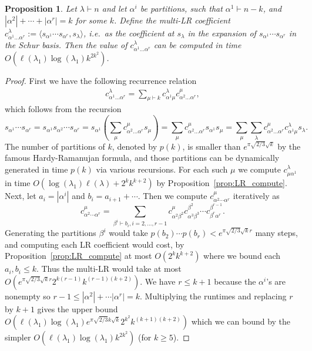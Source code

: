 \documentclass[11pt]{amsart}
\newtheorem{prop}[thm]{Proposition}
\theoremstyle{plain}
\theoremstyle{definition}
\numberwithin{equation}{section}
\newcommand{\la}{\lambda}
\newcommand{\al}{\alpha}
\def\la{\lambda}
\begin{document}
\begin{prop}\label{prop:multiLR_compute}
Let $\la \vdash n$ and let $\al^i$ be partitions, such that $\al^1 \vdash n-k$, and $|\al^2|+\cdots+|\al^r|=k$ for some $k$. Define the multi-LR coefficient $c^{\la}_{\al^1 \ldots \al^r} := \langle s_{\al^1}\cdots s_{\al^r},s_{\la} \rangle$, i.e.\ as the coefficient at $s_\la$ in the expansion of $s_{\al^1}\cdots s_{\al^r}$ in the Schur basis. Then the value of $c^{\la}_{\al^1\ldots \al^r}$ can be computed in time $O(\ell(\la_1) \log(\la_1) k^{2k^2})$.
\end{prop}
\begin{proof}
First we have the following recurrence relation
\begin{align}
c^{\la}_{\al^1\ldots \al^r} = \sum_{\mu \vdash k} c^{\la}_{\al^1 \mu} c^{\mu}_{\al^2 \ldots \al^r},
\end{align}
which follows from the recursion
$$s_{\al^1}\cdots s_{\al^r} = s_{\al^1} s_{\al^2}\cdots s_{\al^r} = s_{\al^1}\left( \sum_{\mu} c^{\mu}_{\al^2\ldots \al^r}s_\mu \right)=\sum_\mu c^{\mu}_{\al^2\ldots \al^r} s_{\al^1}s_\mu = \sum_\mu \sum_\la c^{\mu}_{\al^2\ldots \al^r} c^{\la}_{\al^1\mu} s_\la.$$
The number of partitions of $k$, denoted by $p(k)$, is smaller than $e^{\pi \sqrt{2/3} \sqrt{k}}$ by the famous Hardy-Ramanujan formula, and those partitions can be dynamically generated in time $p(k)$ via various recursions. For each such $\mu$ we compute $c^\la_{\mu \al^1}$ in time $O(\log(\la_1)\ell(\la) + 2^k k^{k+2})$ by Proposition~\ref{prop:LR_compute}. Next, let $a_i=|\al^i|$ and $b_i = a_{i+1}+\cdots$. Then we compute $c^{\mu}_{\al^2\cdots \al^r}$ iteratively as
$$c^{\mu}_{\al^2\cdots \al^r} = \sum_{\beta^i \vdash b_i, i=2,\ldots,r-1} c^{\mu}_{\al^2 \beta^2} c^{\beta^2}_{\al^3 \beta^3}\cdots c^{\beta^{r-1}}_{\beta^r \al^r}.$$
Generating the partitions $\beta^i$ would take $p(b_2)\cdots p(b_r) < e^{\pi \sqrt{2/3} \sqrt{k} r}$ many steps, and computing each LR coefficient would cost, by Proposition~\ref{prop:LR_compute} at most $O(2^k k^{k+2})$ where we bound each $a_i, b_i \leq k$. Thus the multi-LR would take at most $O(e^{\pi \sqrt{2/3} \sqrt{k}  r }2^{k(r-1)} k^{(r-1)(k+2)})$.  We have $r \leq k+1$ because the $\al^i$'s are nonempty so $r-1 \leq |\al^2|+\cdots|\al^r|=k$. Multiplying the runtimes and replacing $r$ by $k+1$ gives the upper  bound $O(\ell(\la_1)\log(\la_1)  e^{\pi \sqrt{2/3} k\sqrt{k}}  2^{k^2} k^{(k+1)(k+2)}  )$ which we can bound by the simpler $O(\ell(\la_1) \log(\la_1) k^{2k^2})$ (for $k\geq 5$). 
\end{proof}
\end{document}
